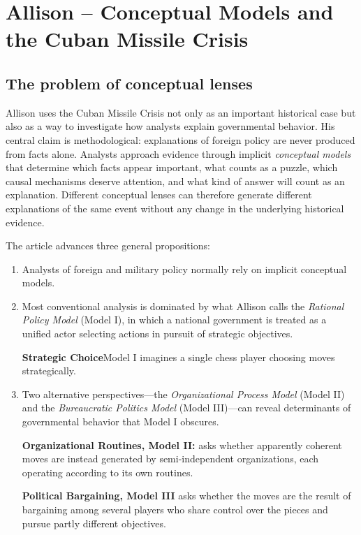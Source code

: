 
\section{Allison -- Conceptual Models and the Cuban Missile Crisis}
\subsection{The problem of conceptual lenses}
Allison uses the Cuban Missile Crisis not only as an important historical case but also as a way to investigate how analysts explain governmental behavior. His central claim is methodological: explanations of foreign policy are never produced from facts alone. Analysts approach evidence through implicit \emph{conceptual models} that determine which facts appear important, what counts as a puzzle, which causal mechanisms deserve attention, and what kind of answer will count as an explanation. Different conceptual lenses can therefore generate different explanations of the same event without any change in the underlying historical evidence.

The article advances three general propositions:

\begin{enumerate}
    \item Analysts of foreign and military policy normally rely on implicit conceptual models.

    \item Most conventional analysis is dominated by what Allison calls the \emph{Rational Policy Model} (Model I), in which a national government is treated as a unified actor selecting actions in pursuit of strategic objectives.

    \textbf{Strategic Choice}Model I imagines a single chess player choosing moves strategically.

    \item Two alternative perspectives---the \emph{Organizational Process Model} (Model II) and the \emph{Bureaucratic Politics Model} (Model III)---can reveal determinants of governmental behavior that Model I obscures.

    \textbf{Organizational Routines, Model II:} asks whether apparently coherent moves are instead generated by semi-independent organizations, each operating according to its own routines.

    \textbf{Political Bargaining, Model III} asks whether the moves are the result of bargaining among several players who share control over the pieces and pursue partly different objectives.
\end{enumerate}

